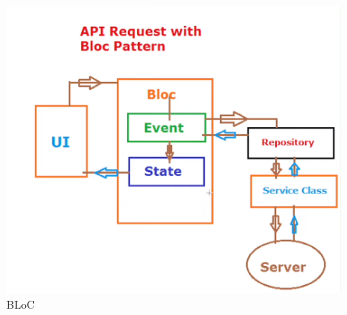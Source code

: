 \begin{figure}
  \centering
  \includegraphics[scale=0.5]{imgs/bloc.png}
  \caption{BLoC }
\end{figure}

